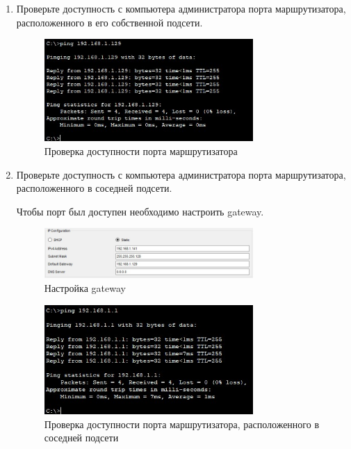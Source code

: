 \documentclass[bachelor, och, labwork]{shiza}
\begin{document}
\begin{enumerate}
        \item Проверьте доступность с компьютера администратора порта маршрутизатора, расположенного в его собственной подсети.
        
        \begin{figure}[H]
            \centering      %
            \includegraphics[width=0.75\textwidth]{8}
            \caption{Проверка доступности порта маршрутизатора}
            \label{fig:image1}
        \end{figure}

        \item Проверьте доступность с компьютера администратора порта маршрутизатора, расположенного в соседней подсети.
        
        Чтобы порт был доступен необходимо настроить gateway.
        
        \begin{figure}[H]
            \centering      %
            \includegraphics[width=0.75\textwidth]{9}
            \caption{Настройка gateway}
            \label{fig:image1}
        \end{figure}

        \begin{figure}[H]
            \centering      %
            \includegraphics[width=0.75\textwidth]{10}
            \caption{Проверка доступности порта маршрутизатора, расположенного в соседней подсети}
            \label{fig:image1}
        \end{figure}


\end{enumerate}
\end{document}
